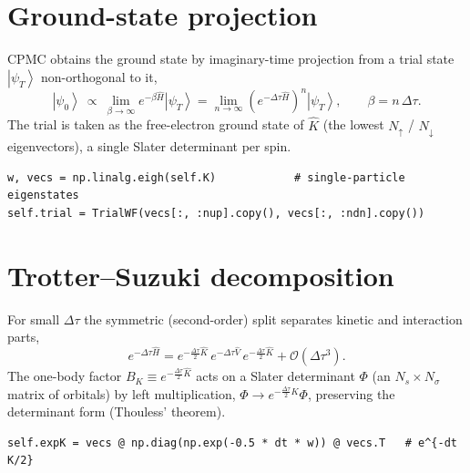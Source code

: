 \documentclass[11pt]{article}
\newcommand{\ket}[1]{\left|#1\right\rangle}
\newcommand{\dt}{\Delta\tau}
\newcommand{\psiT}{\ket{\psi_T}}
\begin{document}
\section{Ground-state projection}
CPMC obtains the ground state by imaginary-time projection from a trial state
$\psiT$ non-orthogonal to it,
\begin{equation}
\ket{\psi_0}\ \propto\ \lim_{\beta\to\infty} e^{-\beta \hat H}\psiT
= \lim_{n\to\infty}\left(e^{-\dt \hat H}\right)^{n}\psiT,
\qquad \beta = n\,\dt .
\label{eq:proj}
\end{equation}
The trial is taken as the free-electron ground state of $\hat K$ (the lowest
$N_\uparrow$ / $N_\downarrow$ eigenvectors), a single Slater determinant per spin.

\begin{lstlisting}[caption={Trial = free-electron ground state
(\texttt{CPMC.\_\_init\_\_}).}]
w, vecs = np.linalg.eigh(self.K)            # single-particle eigenstates
self.trial = TrialWF(vecs[:, :nup].copy(), vecs[:, :ndn].copy())
\end{lstlisting}

\section{Trotter--Suzuki decomposition}
For small $\dt$ the symmetric (second-order) split separates kinetic and
interaction parts,
\begin{equation}
e^{-\dt \hat H} = e^{-\frac{\dt}{2}\hat K}\, e^{-\dt \hat V}\,
e^{-\frac{\dt}{2}\hat K} + \mathcal{O}(\dt^{3}).
\label{eq:trotter}
\end{equation}
The one-body factor $B_K \equiv e^{-\frac{\dt}{2}\hat K}$ acts on a Slater
determinant $\Phi$ (an $N_s\times N_\sigma$ matrix of orbitals) by left
multiplication, $\Phi\to e^{-\frac{\dt}{2}K}\Phi$, preserving the determinant
form (Thouless' theorem).

\begin{lstlisting}[caption={Half-step kinetic propagator
(\texttt{LatticeModel}).}]
self.expK = vecs @ np.diag(np.exp(-0.5 * dt * w)) @ vecs.T   # e^{-dt K/2}
\end{lstlisting}
\end{document}
